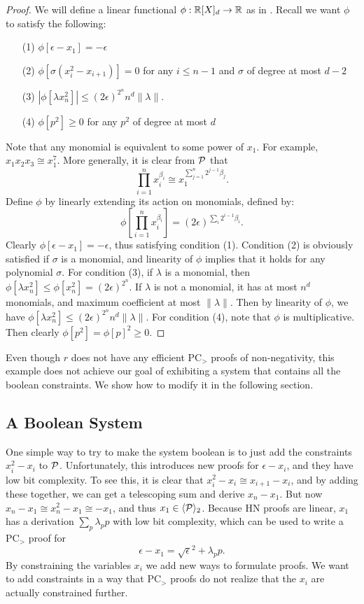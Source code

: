 \begin{proof}
We will define a linear functional $\phi: \mathbb R[X]_d \rightarrow \mathbb R$ as in . Recall we want $\phi$ to satisfy the following:
\begin{enumerate}
\item[(1)] $\phi[\epsilon - x_1] = -\epsilon$
\item[(2)] $\phi[\sigma(x_i^2 - x_{i+1})] = 0$ for any $i \leq n-1$ and $\sigma$ of degree at most $d-2$
\item[(3)] $|\phi[\lambda x_n^2]| \leq (2\epsilon)^{2^{n}}n^d\|\lambda\|$.
\item[(4)] $\phi[p^2] \geq 0$ for any $p^2$ of degree at most $d$
\end{enumerate}

Note that any monomial is equivalent to some power of $x_1$. For example, $x_1x_2x_3 \cong x_1^7$.  More generally, it is clear from $\mathcal P$ that 
\[\prod_{i = 1}^n x_i^{\beta_i} \cong x_1^{\sum_{j = 1}^n 2^{j-1} \beta_j}.\] 
Define $\phi$ by linearly extending its action on monomials, defined by:
\[\phi\left[ \prod_{i = 1}^n x_i^{\beta_i}\right] = (2\epsilon)^{\sum_{i} 2^{i-1} \beta_i }. \]
Clearly $\phi[\epsilon - x_1] = -\epsilon$, thus satisfying condition (1). Condition (2) is obviously satisfied if $\sigma$ is a monomial, and linearity of $\phi$ implies that it holds for any polynomial $\sigma$. For condition (3), if $\lambda$ is a monomial, then $\phi[\lambda x_n^2] \leq \phi[x_n^2] = (2\epsilon)^{2^{n}}$. If $\lambda$ is not a monomial, it has at most $n^d$ monomials, and maximum coefficient at most $\|\lambda\|$. Then by linearity of $\phi$, we have $\phi[\lambda x_n^2] \leq (2\epsilon)^{2^n}n^d\|\lambda\|$. For condition (4), note that $\phi$ is multiplicative. Then clearly $\phi[p^2] = \phi[p]^2 \geq 0$. 
\end{proof}

Even though $r$ does not have any efficient PC$_>$ proofs of non-negativity, this example does not achieve our goal of exhibiting a system that contains all the boolean constraints. We show how to modify it in the following section.

\subsection{A Boolean System}
One simple way to try to make the system boolean is to just add the constraints $x_i^2 - x_i$ to $\mathcal P$. Unfortunately, this introduces new proofs for $\epsilon - x_i$, and they have low bit complexity. To see this, it is clear that $x_i^2 - x_i \cong x_{i+1} - x_i$, and by adding these together, we can get a telescoping sum and derive $x_n - x_1$. But now $x_n - x_1 \cong x_n^2 - x_1 \cong -x_1$, and thus $x_1 \in \langle \mathcal P \rangle_2$. Because HN proofs are linear, $x_1$ has a derivation $\sum_p \lambda_p p$ with low bit complexity, which can be used to write a PC$_>$ proof for 
\[\epsilon - x_1 = \sqrt{\epsilon}^2 + \lambda_p p.\]
By constraining the variables $x_i$ we add new ways to formulate proofs. We want to add constraints in a way that PC$_>$ proofs do not realize that the $x_i$ are actually constrained further.

